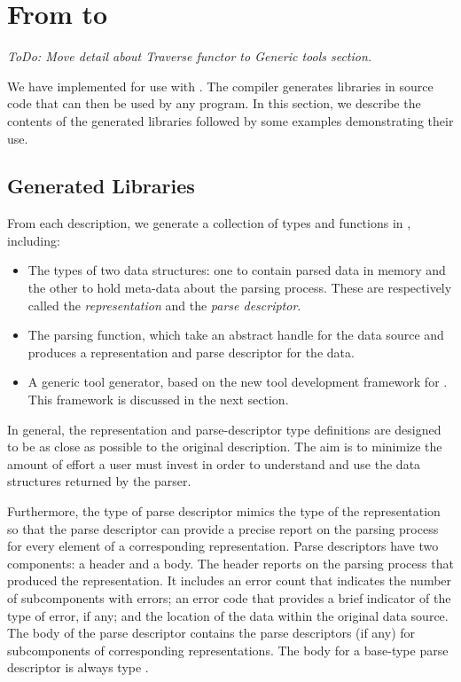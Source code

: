 \section{From \padsmlbig{} to \ocamlbig{}}
\label{sec:padsml-impl}

{\em
ToDo: Move detail about Traverse functor to Generic tools section.
}

We have implemented \padsml{} for use with \ocaml{}. The \padsml{}
compiler generates libraries in \ocaml{} source code that can then be
used by any \ocaml{} program. In this section, we describe the
contents of the generated libraries followed by some examples
demonstrating their use.


\subsection{Generated Libraries}
\label{sec:gen-code}

From each \padsml{} description, we generate a collection of types and
functions in \ocaml{}, including:
\begin{itemize}
\item The types of two data structures: one to contain parsed data in
  memory and the other to hold meta-data about the parsing process.
  These are respectively called the \emph{representation} and
  the \emph{parse descriptor}.
\item The parsing function, which take an abstract handle for the data
  source and produces a representation and parse descriptor for the
  data.
\item A generic tool generator, based on the new tool development
  framework for \padsml{}. This framework is discussed in the next
  section.
\end{itemize} 

In general, the representation and parse-descriptor type definitions
are designed to be as close as possible to the original description.
The aim is to minimize the amount of effort a user must invest in
order to understand and use the data structures returned by the
parser.

Furthermore, the type of parse descriptor mimics the type of the
representation so that the parse descriptor can provide a precise
report on the parsing process for every element of a corresponding
representation. Parse descriptors have two components: a header and a
body. The header reports on the parsing process that produced the
representation. It includes an error count that indicates the number
of subcomponents with errors; an error code that provides a brief
indicator of the type of error, if any; and the location of the data
within the original data source. The body of the parse descriptor
contains the parse descriptors (if any) for subcomponents of
corresponding representations. The body for a base-type parse
descriptor is always type .

